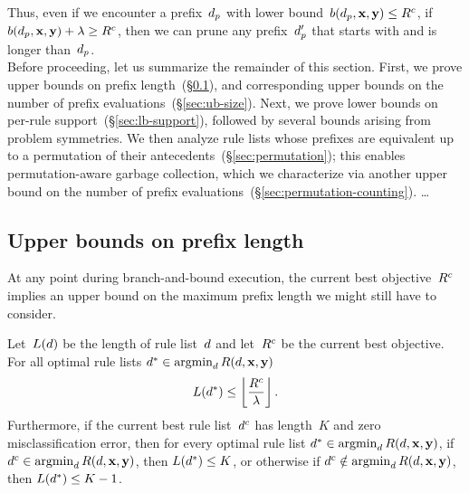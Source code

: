 Thus, even if we encounter a prefix~$d_p$
with lower bound~${b(d_p, \mathbf{x}, \mathbf{y}) \le {R^c}}$,
if ${b(d_p, \mathbf{x}, \mathbf{y}) + {\lambda} \ge {R^c}}$, then we can prune
any prefix~$d_p'$ that starts with and is longer than~$d_p$. \\

Before proceeding, let us summarize the remainder of this section.
%
First, we prove upper bounds on prefix
length~(\S\ref{sec:ub-prefix-length}),
and corresponding upper bounds on the number of
prefix evaluations~(\S\ref{sec:ub-size}).
%
Next, we prove lower bounds on per-rule support~(\S\ref{sec:lb-support}),
followed by several bounds arising from problem symmetries.
%
We then analyze rule lists whose prefixes are equivalent up to
a permutation of their antecedents~(\S\ref{sec:permutation});
this enables permutation-aware garbage collection, which we
characterize via another upper bound on the number of prefix evaluations~(\S\ref{sec:permutation-counting}).
%
\dots

\subsection{Upper bounds on prefix length}
\label{sec:ub-prefix-length}

At any point during branch-and-bound execution, the current best objective~${R^c}$
implies an upper bound on the maximum prefix length we might still have to consider.

\begin{theorem}
\label{thm:ub-prefix-length}
Let~$L({d})$ be the length of rule list~${d}$
and let~${R^c}$ be the current best objective.
For all optimal rule lists ${d^* \in \operatorname*{argmin}_{d} R({d}, \mathbf{x}, \mathbf{y})}$
\begin{align}
L(\OptimalRL) \le \left\lfloor \frac{\CurrentObj}{\Reg} \right\rfloor.
\label{eq:max-length}
\end{align}
Furthermore, if the current best rule list~$d^c$
has length~$K$ and zero misclassification error,
then for every optimal rule list
${d^* \in \operatorname*{argmin}_{d} R({d}, \mathbf{x}, \mathbf{y})}$,
if ${d^c \in \operatorname*{argmin}_d R({d}, \mathbf{x}, \mathbf{y})}$,
then ${L(d^*) \le K}$,
or otherwise if ${d^c \notin \operatorname*{argmin}_d R({d}, \mathbf{x}, \mathbf{y})}$,
then ${L(d^*) \le K - 1}$.
\end{theorem}

